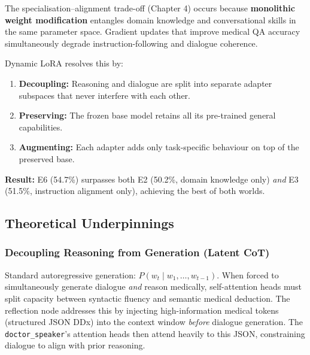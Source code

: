 \begin{acadbox}[\textcolor{white}{Academic Definition}]
The specialisation--alignment trade-off (Chapter 4) occurs because \textbf{monolithic weight modification} entangles domain knowledge and conversational skills in the same parameter space. Gradient updates that improve medical QA accuracy simultaneously degrade instruction-following and dialogue coherence.

Dynamic LoRA resolves this by:
\begin{enumerate}
    \item \textbf{Decoupling:} Reasoning and dialogue are split into separate adapter subspaces that never interfere with each other.
    \item \textbf{Preserving:} The frozen base model retains all its pre-trained general capabilities.
    \item \textbf{Augmenting:} Each adapter adds only task-specific behaviour on top of the preserved base.
\end{enumerate}

\textbf{Result:} E6 (54.7\%) surpasses both E2 (50.2\%, domain knowledge only) \textit{and} E3 (51.5\%, instruction alignment only), achieving the best of both worlds.
\end{acadbox}

\subsection{Theoretical Underpinnings}

\subsubsection{Decoupling Reasoning from Generation (Latent CoT)}

\begin{acadbox}[\textcolor{white}{Academic Definition}]
Standard autoregressive generation: $P(w_t \mid w_1, \ldots, w_{t-1})$. When forced to simultaneously generate dialogue \textit{and} reason medically, self-attention heads must split capacity between syntactic fluency and semantic medical deduction. The reflection node addresses this by injecting high-information medical tokens (structured JSON DDx) into the context window \textit{before} dialogue generation. The \texttt{doctor\_speaker}'s attention heads then attend heavily to this JSON, constraining dialogue to align with prior reasoning.
\end{acadbox}

